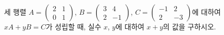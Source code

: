 \hspace*{2mm}\begin{minipage}[t]{\dimexpr\linewidth-2mm\relax}\vspace{0pt}
세 행렬 $A=\begin{pmatrix} 2 & 1 \\ 0 & 1 \end{pmatrix}$, $B=\begin{pmatrix} 3 & 4 \\ 2 & -1 \end{pmatrix}$, $C=\begin{pmatrix} -1 & 2 \\ 2 & -3 \end{pmatrix}$에 대하여 $xA+yB=C$가 성립할 때, 실수 $x$, $y$에 대하여 $x+y$의 값을 구하시오.\end{minipage}

